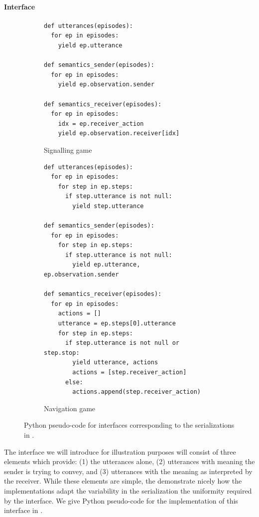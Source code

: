\paragraph{Interface}


\begin{figure}
  \centering
  \begin{subfigure}[t]{0.4\linewidth}
    \centering
    \footnotesize
\begin{verbatim}
def utterances(episodes):
  for ep in episodes:
    yield ep.utterance

def semantics_sender(episodes):
  for ep in episodes:
    yield ep.observation.sender

def semantics_receiver(episodes):
  for ep in episodes:
    idx = ep.receiver_action
    yield ep.observation.receiver[idx]
\end{verbatim}
    \caption{Signalling game}
  \end{subfigure}
  \hfill
  \begin{subfigure}[t]{0.55\linewidth}
    \centering
    \footnotesize
\begin{verbatim}
def utterances(episodes):
  for ep in episodes:
    for step in ep.steps:
      if step.utterance is not null:
        yield step.utterance

def semantics_sender(episodes):
  for ep in episodes:
    for step in ep.steps:
      if step.utterance is not null:
        yield ep.utterance, ep.observation.sender

def semantics_receiver(episodes):
  for ep in episodes:
    actions = []
    utterance = ep.steps[0].utterance
    for step in ep.steps:
      if step.utterance is not null or step.stop:
        yield utterance, actions
        actions = [step.receiver_action]
      else:
        actions.append(step.receiver_action)
\end{verbatim}
    \caption{Navigation game}
  \end{subfigure}
  \caption{Python pseudo-code for interfaces corresponding to the serializations in .}
  \unskip\label{fig:interface}
\end{figure}

The interface we will introduce for illustration purposes will consist of three elements which provide:
  (1) the utterances alone,
  (2) utterances with meaning the sender is trying to convey,
  and (3) utterances with the meaning as interpreted by the receiver.
While these elements are simple, the demonstrate nicely how the implementations adapt the variability in the serialization the uniformity required by the interface.
We give Python pseudo-code for the implementation of this interface in .

